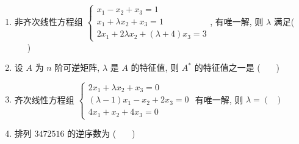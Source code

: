 \begin{enumerate}
	\item 非齐次线性方程组 $\begin{cases} x_1 - x_2 + x_3 = 1 \\ x_1 + \lambda x_2 + x_3 = 1 \\ 2x_1 + 2\lambda x_2 + (\lambda+4)x_3 = 3 \end{cases}$, 有唯一解, 则 $\lambda$ 满足( \ \ \ )
	\vspace{0.5em}
	
	\item 设 $A$ 为 $n$ 阶可逆矩阵, $\lambda$ 是 $A$ 的特征值, 则 $A^*$ 的特征值之一是 ( \ \ \ )
	\vspace{0.5em}
	
	\item 齐次线性方程组 $\begin{cases} 2x_1 + \lambda x_2 + x_3 = 0 \\ (\lambda-1)x_1 - x_2 + 2x_3 = 0 \\ 4x_1 + x_2 + 4x_3 = 0 \end{cases}$ 有唯一解, 则 $\lambda = ( \ \ \ )$
	\vspace{0.5em}
	
	\item 排列 $3472516$ 的逆序数为 ( \ \ \ )
	\vspace{0.5em}
	

\end{enumerate}
